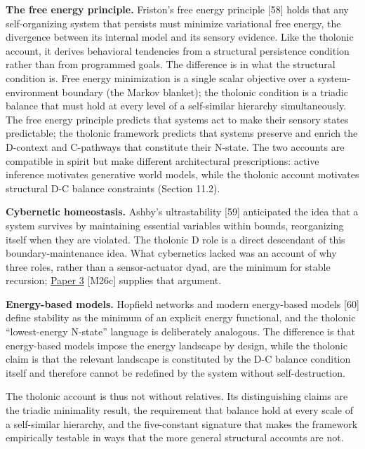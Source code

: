 \documentclass[
  11pt,
  letterpaper,
]{article}
\begin{document}
\textbf{The free energy principle.} Friston's free energy principle
{[}58{]} holds that any self-organizing system that persists must
minimize variational free energy, the divergence between its internal
model and its sensory evidence. Like the tholonic account, it derives
behavioral tendencies from a structural persistence condition rather
than from programmed goals. The difference is in what the structural
condition is. Free energy minimization is a single scalar objective over
a system-environment boundary (the Markov blanket); the tholonic
condition is a triadic balance that must hold at every level of a
self-similar hierarchy simultaneously. The free energy principle
predicts that systems act to make their sensory states predictable; the
tholonic framework predicts that systems preserve and enrich the
D-context and C-pathways that constitute their N-state. The two accounts
are compatible in spirit but make different architectural prescriptions:
active inference motivates generative world models, while the tholonic
account motivates structural D-C balance constraints (Section 11.2).

\textbf{Cybernetic homeostasis.} Ashby's ultrastability {[}59{]}
anticipated the idea that a system survives by maintaining essential
variables within bounds, reorganizing itself when they are violated. The
tholonic D role is a direct descendant of this boundary-maintenance
idea. What cybernetics lacked was an account of why three roles, rather
than a sensor-actuator dyad, are the minimum for stable recursion;
\href{https://github.com/baardev/truevalue/blob/main/docnav/Research/papers/3_minimal-recursive-triadic-framework/3_minimal-recursive-triadic-framework.pdf}{Paper
3} {[}M26c{]} supplies that argument.

\textbf{Energy-based models.} Hopfield networks and modern energy-based
models {[}60{]} define stability as the minimum of an explicit energy
functional, and the tholonic ``lowest-energy N-state'' language is
deliberately analogous. The difference is that energy-based models
impose the energy landscape by design, while the tholonic claim is that
the relevant landscape is constituted by the D-C balance condition
itself and therefore cannot be redefined by the system without
self-destruction.

The tholonic account is thus not without relatives. Its distinguishing
claims are the triadic minimality result, the requirement that balance
hold at every scale of a self-similar hierarchy, and the five-constant
signature that makes the framework empirically testable in ways that the
more general structural accounts are not.
\end{document}
